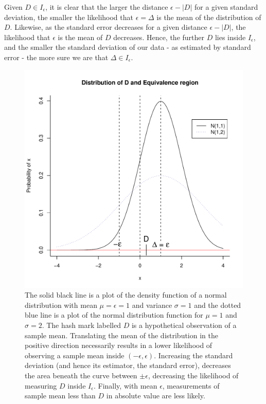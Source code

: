  Given $D \in I_\epsilon$, it is clear that the larger the distance $\epsilon - |D|$ for a given standard deviation, the smaller the likelihood that $\epsilon = \Delta$  is the mean of  the distribution of $D$. Likewise, as the standard error decreases for a given distance $\epsilon - |D|$, the likelihood that $\epsilon$ is the mean of  $D$ decreases. Hence, the further $D$ lies inside $I_\epsilon$, and the smaller the standard deviation of our data - as estimated by standard error - the more sure we are that $\Delta \in I_\epsilon$. 
 
  \begin{figure}
\begin{center}
\includegraphics{DiagramNormal.pdf}
\end{center}
\caption{ The solid black line is a plot of the density function of a normal distribution with mean $\mu = \epsilon = 1$ and variance $\sigma = 1$ and the dotted blue line is a plot of the normal distribution  function for $\mu = 1$ and  $\sigma = 2$. The hash mark labelled $D$ is a hypothetical observation of a sample mean. Translating the mean of the distribution in the positive direction necessarily results in a lower likelihood of observing a sample mean inside $(-\epsilon, \epsilon)$. Increasing the standard deviation (and hence its estimator, the standard error), decreases the area beneath the curve between $\pm \epsilon$, decreasing the likelihood of measuring $D$ inside $I_\epsilon$. Finally, with mean $\epsilon$, measurements of sample mean less than $D$ in absolute value are less likely.}
\label{DiagramNormal}
\end{figure}

